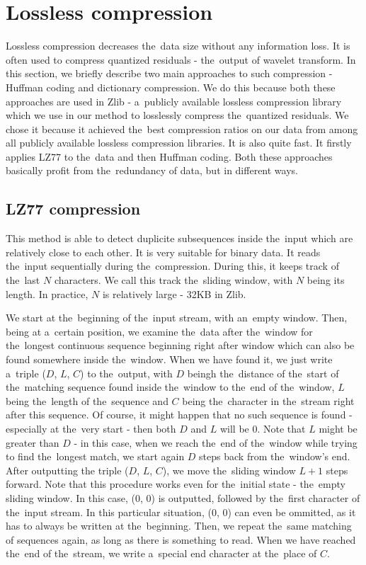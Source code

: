 \section{Lossless compression}\label{sec:dictionary_compression}

Lossless compression decreases the~data size without any information loss. It is often used to compress quantized residuals - the~output of wavelet transform. In this section, we briefly describe two main approaches to such compression - Huffman coding and dictionary compression. We do this because both these approaches are used in Zlib - a~publicly available lossless compression library which we use in our method to losslessly compress the~quantized residuals. We chose it because it achieved the~best compression ratios on our data from among all publicly available lossless compression libraries. It is also quite fast. It firstly applies LZ77 to the~data and then Huffman coding. Both these approaches basically profit from the~redundancy of data, but in different ways.

\subsection{LZ77 compression}\label{subsec:lz77}

This method is able to detect duplicite subsequences inside the~input which are relatively close to each other. It is very suitable for binary data. It reads the~input sequentially during the~compression. During this, it keeps track of the~last $N$ characters. We call this track the~sliding window, with $N$ being its length. In practice, $N$ is relatively large - 32KB in Zlib. 

We start at the~beginning of the~input stream, with an~empty window. Then, being at a~certain position, we examine the~data after the~window for the~longest continuous sequence beginning right after window which can also be found somewhere inside the~window. When we have found it, we just write a~triple ($D$, $L$, $C$) to the~output, with $D$ beingh the~distance of the~start of the~matching sequence found inside the~window to the~end of the~window, $L$ being the~length of the~sequence and $C$ being the~character in the~stream right after this sequence. Of course, it might happen that no such sequence is found - especially at the~very start - then both $D$ and $L$ will be 0. Note that $L$ might be greater than $D$ - in this case, when we reach the~end of the~window while trying to find the~longest match, we start again $D$ steps back from the~window's end. After outputting the triple ($D$, $L$, $C$), we move the~sliding window $L + 1$ steps forward. Note that this procedure works even for the~initial state - the~empty sliding window. In this case, (0, 0) is outputted, followed by the~first character of the~input stream. In this particular situation, (0, 0) can even be ommitted, as it has to always be written at the~beginning. Then, we repeat the~same matching of sequences again, as long as there is something to read. When we have reached the~end of the~stream, we write a~special end character at the~place of $C$.

